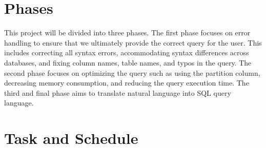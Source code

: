 \section{Phases}
This project will be divided into three phases. The first phase focuses on error handling to ensure that we ultimately provide the correct query for the user. This includes correcting all syntax errors, accommodating syntax differences across databases, and fixing column names, table names, and typos in the query. The second phase focuses on optimizing the query such as using the partition column, decreasing memory consumption, and reducing the query execution time. The third and final phase aims to translate natural language into SQL query language.


\pagebreak
\section{Task and Schedule}

